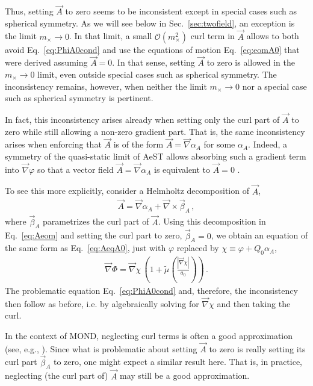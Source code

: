 \documentclass[reprint, amsmath,amssymb, nofootinbib, aps, prd]{revtex4-2}
\begin{document}
Thus, setting $\vec{A}$ to zero seems to be inconsistent except in special cases such as spherical symmetry.
As we will see below in Sec.~\ref{sec:twofield}, an exception  is the limit $m_\times \to 0$.
In that limit, a small $\mathcal{O}(m_\times^2)$ curl term in $\vec{A}$ allows to both avoid Eq.~\eqref{eq:PhiA0cond} and use the equations of motion Eq.~\eqref{eq:eomA0} that were derived assuming $\vec{A} = 0$.
In that sense, setting $\vec{A}$ to zero is allowed in the $m_\times \to 0$ limit, even outside special cases such as spherical symmetry.
The inconsistency remains, however, when neither the limit $m_\times \to 0$ nor a special case such as spherical symmetry is pertinent. 

In fact, this inconsistency arises already when setting only the curl part of $\vec{A}$ to zero while still allowing a non-zero gradient part.
That is, the same inconsistency arises when enforcing that $\vec{A}$ is of the form $\vec{A} = \vec{\nabla} \alpha_A$ for some $\alpha_A$.
Indeed, a symmetry of the quasi-static limit of AeST allows absorbing such a gradient term into $\vec{\nabla} \varphi$ so that a vector field $\vec{A} = \vec{\nabla} \alpha_A$ is equivalent to $\vec{A} = 0$ \cite{Skordis2021}.

To see this more explicitly, consider a Helmholtz decomposition of $\vec{A}$,
\begin{align}
 \vec{A} = \vec{\nabla} \alpha_A + \vec{\nabla} \times \vec{\beta}_A \,,
\end{align}
where $\vec{\beta}_A$ parametrizes the curl part of $\vec{A}$.
Using this decomposition in Eq.~\eqref{eq:Aeom} and setting the curl part to zero, $\vec{\beta}_A = 0$, we obtain an equation of the same form as Eq.~\eqref{eq:AeqA0}, just with $\varphi$ replaced by $\chi \equiv \varphi + Q_0 \alpha_A$,
\begin{align}
\vec{\nabla} \Phi = \vec{\nabla} \chi \, \left(1 + \tilde{\mu}\left(\frac{|\vec{\nabla} \chi|}{a_0} \right)\right) \,.
\end{align}
The problematic equation Eq.~\eqref{eq:PhiA0cond} and, therefore, the inconsistency then follow as before, i.e. by algebraically solving for $\vec{\nabla} \chi$ and then taking the curl.

In the context of MOND, neglecting curl terms is often a good approximation (see, e.g., \cite{Bekenstein1984}).
Since what is problematic about setting $\vec{A}$ to zero is really setting its curl part $\vec{\beta}_A$ to zero, one might expect a similar result here.
That is, in practice, neglecting (the curl part of) $\vec{A}$ may still be a good approximation.
\end{document}
